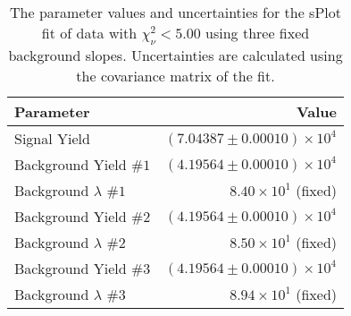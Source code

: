 
\begin{table}[ht]
    \begin{center}
        \begin{tabular}{lr}\toprule
            Parameter & Value \\\midrule
            Signal Yield & $(7.04387 \pm 0.00010) \times 10^{4}$ \\
            Background Yield $\#1$ & $(4.19564 \pm 0.00010) \times 10^{4}$ \\
            Background $\lambda$ $\#1$ & $8.40 \times 10^{1}$ (fixed) \\
            Background Yield $\#2$ & $(4.19564 \pm 0.00010) \times 10^{4}$ \\
            Background $\lambda$ $\#2$ & $8.50 \times 10^{1}$ (fixed) \\
            Background Yield $\#3$ & $(4.19564 \pm 0.00010) \times 10^{4}$ \\
            Background $\lambda$ $\#3$ & $8.94 \times 10^{1}$ (fixed) \\\bottomrule
        \end{tabular}
        \caption{The parameter values and uncertainties for the sPlot fit of data with $\chi^2_\nu < 5.00$ using three fixed background slopes. Uncertainties are calculated using the covariance matrix of the fit.}\label{tab:splot-fit-results-chisqdof-5.00-fixed-3}
    \end{center}
\end{table}
